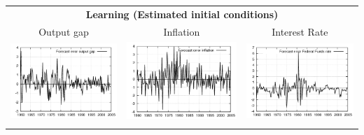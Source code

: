 \documentclass{beamer}
\begin{document}
{\begin{center}
\begin{tabular}{ccc}
  \multicolumn{3}{c}{\textbf{Learning (Estimated initial conditions)}}  \\
  \small{Output gap} & \small{Inflation} & \small{Interest Rate} \\
  \includegraphics[scale=0.23]{plots2/initest_Forecast_error_output_gap.png} & \includegraphics[scale=0.23]{plots2/initest_Forecast_error_inflation.png} & \includegraphics[scale=0.23]{plots2/initest_Forecast_error_Federal_Funds_rate.png} \\ \\
  \end{tabular}
  \end{center}
}
\end{document}
